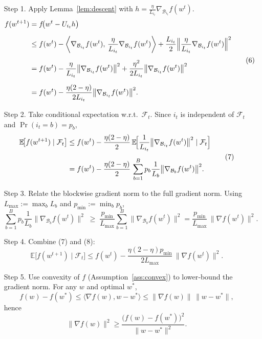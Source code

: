 \documentclass{article}
\newcommand{\E}{\mathbb{E}}
\begin{document}
\begin{enumerate}
\item[Step 1.]  Apply Lemma~\ref{lem:descent} with $h=\frac{\eta}{L_{i_{t}}}\nabla_{\mathcal{B}_{i_{t}}}f(w^{t})$.
\[
\begin{aligned}
f(w^{t+1})
&=f\!\bigl(w^{t}-U_{i_{t}}h\bigr)\\[2mm]
&\le f(w^{t})
-\biggl\langle\nabla_{\mathcal{B}_{i_{t}}}f(w^{t}),\,
\frac{\eta}{L_{i_{t}}}\nabla_{\mathcal{B}_{i_{t}}}f(w^{t})\biggr\rangle
+\frac{L_{i_{t}}}{2}\Bigl\|\frac{\eta}{L_{i_{t}}}\nabla_{\mathcal{B}_{i_{t}}}f(w^{t})\Bigr\|^{2}\\[2mm]
&=f(w^{t})-\frac{\eta}{L_{i_{t}}}\bigl\|\nabla_{\mathcal{B}_{i_{t}}}f(w^{t})\bigr\|^{2}
+\frac{\eta^{2}}{2L_{i_{t}}}\bigl\|\nabla_{\mathcal{B}_{i_{t}}}f(w^{t})\bigr\|^{2}\\[2mm]
&=f(w^{t})-\frac{\eta(2-\eta)}{2L_{i_{t}}}
\bigl\|\nabla_{\mathcal{B}_{i_{t}}}f(w^{t})\bigr\|^{2}.
\end{aligned}
\tag{6}
\]

\item[Step 2.]  Take conditional expectation w.r.t.\ $\mathcal{F}_{t}$.
Since $i_{t}$ is independent of $\mathcal{F}_{t}$ and $\Pr(i_{t}=b)=p_{b}$,
\[
\begin{aligned}
\E\!\bigl[f(w^{t+1})\mid\mathcal{F}_{t}\bigr]
&\le f(w^{t})-\frac{\eta(2-\eta)}{2}\,
\E\!\Bigl[\frac{1}{L_{i_{t}}}\bigl\|\nabla_{\mathcal{B}_{i_{t}}}f(w^{t})\bigr\|^{2}\mid\mathcal{F}_{t}\Bigr]\\[2mm]
&= f(w^{t})-\frac{\eta(2-\eta)}{2}\,
\sum_{b=1}^{B}p_{b}\frac{1}{L_{b}}
\bigl\|\nabla_{\mathcal{B}_{b}}f(w^{t})\bigr\|^{2}.
\end{aligned}
\tag{7}
\]

\item[Step 3.]  Relate the blockwise gradient norm to the full gradient norm.
Using $L_{\max}:=\max_{b}L_{b}$ and $p_{\min}:=\min_{b}p_{b}$,
\[
\sum_{b=1}^{B}p_{b}\frac{1}{L_{b}}
\bigl\|\nabla_{\mathcal{B}_{b}}f(w^{t})\bigr\|^{2}
\;\ge\;
\frac{p_{\min}}{L_{\max}}\sum_{b=1}^{B}
\bigl\|\nabla_{\mathcal{B}_{b}}f(w^{t})\bigr\|^{2}
=
\frac{p_{\min}}{L_{\max}}\,
\bigl\|\nabla f(w^{t})\bigr\|^{2}.
\tag{8}
\]

\item[Step 4.]  Combine (7) and (8):
\[
\E\!\bigl[f(w^{t+1})\mid\mathcal{F}_{t}\bigr]
\le f(w^{t})-
\frac{\eta(2-\eta)p_{\min}}{2L_{\max}}\,
\bigl\|\nabla f(w^{t})\bigr\|^{2}.
\tag{9}
\]

\item[Step 5.]  Use convexity of $f$ (Assumption~\ref{ass:convex}) to lower‑bound the gradient norm.
For any $w$ and optimal $w^{*}$,
\[
f(w)-f(w^{*})\le\langle\nabla f(w),w-w^{*}\rangle
\le \|\nabla f(w)\|\,\|w-w^{*}\|,
\]
hence
\[
\|\nabla f(w)\|^{2}\ge\frac{\bigl(f(w)-f(w^{*})\bigr)^{2}}{\|w-w^{*}\|^{2}}.
\tag{10}
\]


\end{enumerate}
\end{document}
